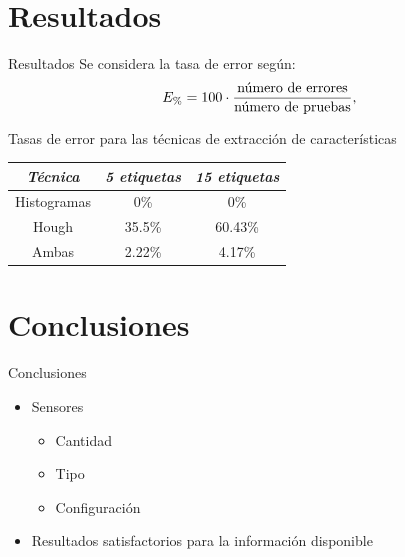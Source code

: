 \documentclass[spanish]{beamer}
\begin{document}
\section[Outline]{Resultados}

\begin{frame}{Resultados}
  Se considera la tasa de error según:
  \begin{equation*}
    E_{\%}=100\cdot\frac{\textrm{número de errores}}{\textrm{número de pruebas}},
  \end{equation*}


  Tasas de error para las técnicas de extracción de características
  \begin{center}\begin{tabular}{ccc}
      \hline \emph{{Técnica}} & \emph{5 etiquetas} & \emph{15 etiquetas}\\
      \hline Histogramas & 0\% & 0\%\\
      \hline Hough & 35.5\% & 60.43\%\\
      \hline Ambas & 2.22\% & 4.17\%\\
      \hline
  \end{tabular}\end{center}
  \label{tablaerrores}


\end{frame}


\section[Outline]{Conclusiones}

\begin{frame}{Conclusiones}
  \begin{itemize}
  \item Sensores
    \begin{itemize}
    \item Cantidad
    \item Tipo
    \item Configuración
    \end{itemize}
  \item Resultados satisfactorios para la información disponible
  \end{itemize}
\end{frame}
\end{document}
